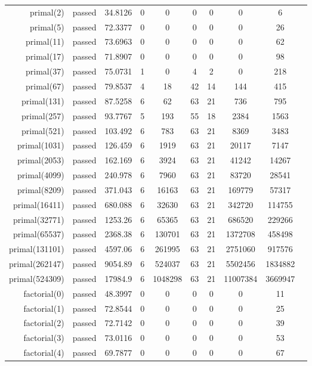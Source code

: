 \begin{longtable}{r|ccccccccc}
    primal(2) & passed & 34.8126 & 0 & 0 & 0 & 0 & 0 & 6 \\
    primal(5) & passed & 72.3377 & 0 & 0 & 0 & 0 & 0 & 26 \\
    primal(11) & passed & 73.6963 & 0 & 0 & 0 & 0 & 0 & 62 \\
    primal(17) & passed & 71.8907 & 0 & 0 & 0 & 0 & 0 & 98 \\
    primal(37) & passed & 75.0731 & 1 & 0 & 4 & 2 & 0 & 218 \\
    primal(67) & passed & 79.8537 & 4 & 18 & 42 & 14 & 144 & 415 \\
    primal(131) & passed & 87.5258 & 6 & 62 & 63 & 21 & 736 & 795 \\
    primal(257) & passed & 93.7767 & 5 & 193 & 55 & 18 & 2384 & 1563 \\
    primal(521) & passed & 103.492 & 6 & 783 & 63 & 21 & 8369 & 3483 \\
    primal(1031) & passed & 126.459 & 6 & 1919 & 63 & 21 & 20117 & 7147 \\
    primal(2053) & passed & 162.169 & 6 & 3924 & 63 & 21 & 41242 & 14267 \\
    primal(4099) & passed & 240.978 & 6 & 7960 & 63 & 21 & 83720 & 28541 \\
    primal(8209) & passed & 371.043 & 6 & 16163 & 63 & 21 & 169779 & 57317 \\
    primal(16411) & passed & 680.088 & 6 & 32630 & 63 & 21 & 342720 & 114755 \\
    primal(32771) & passed & 1253.26 & 6 & 65365 & 63 & 21 & 686520 & 229266 \\
    primal(65537) & passed & 2368.38 & 6 & 130701 & 63 & 21 & 1372708 & 458498 \\
    primal(131101) & passed & 4597.06 & 6 & 261995 & 63 & 21 & 2751060 & 917576 \\
    primal(262147) & passed & 9054.89 & 6 & 524037 & 63 & 21 & 5502456 & 1834882 \\
    primal(524309) & passed & 17984.9 & 6 & 1048298 & 63 & 21 & 11007384 & 3669947 \\
    factorial(0) & passed & 48.3997 & 0 & 0 & 0 & 0 & 0 & 11 \\
    factorial(1) & passed & 72.8544 & 0 & 0 & 0 & 0 & 0 & 25 \\
    factorial(2) & passed & 72.7142 & 0 & 0 & 0 & 0 & 0 & 39 \\
    factorial(3) & passed & 73.0116 & 0 & 0 & 0 & 0 & 0 & 53 \\
    factorial(4) & passed & 69.7877 & 0 & 0 & 0 & 0 & 0 & 67 \\

\end{longtable}
